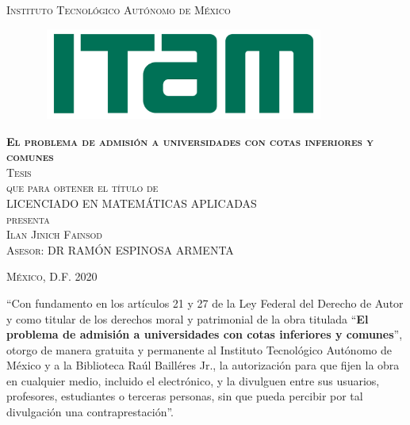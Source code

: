 \documentclass[11pt, oneside]{book}
\begin{document}
\begin{titlepage}
\begin{center}

\textsc{\Large Instituto Tecnológico Autónomo de México}\\[4em]

\begin{figure}[h]
\begin{center}
\includegraphics[width=9.7cm, height=3cm]{logo-ITAM}
\end{center}
\end{figure}

\vspace{4em}

\textsc{\huge \textbf{El problema de admisión a universidades con cotas inferiores y comunes}}\\[4em]

\textsc{\large Tesis}\\[1em]

\textsc{que para obtener el título de}\\[1em]

\textsc{LICENCIADO EN MATEMÁTICAS APLICADAS}\\[1em]

\textsc{presenta}\\[1em]

\textsc{\Large Ilan Jinich Fainsod}\\[1em]

\textsc{\large Asesor: DR RAMÓN ESPINOSA ARMENTA }

\end{center}

\vspace*{\fill}
\textsc{México, D.F. \hspace*{\fill} 2020}

\end{titlepage}



\thispagestyle{empty}
\vspace*{\fill}
\begingroup
``Con fundamento en los artículos 21 y 27 de la Ley Federal del Derecho de Autor y como titular de los derechos moral y patrimonial de la obra titulada ``\textbf{El problema de admisión a universidades con cotas inferiores y comunes}'', otorgo de manera gratuita y permanente al Instituto Tecnológico Autónomo de México y a la Biblioteca Raúl Bailléres Jr., la autorización para que fijen la obra en cualquier medio, incluido el electrónico, y la divulguen entre sus usuarios, profesores, estudiantes o terceras personas, sin que pueda percibir por tal divulgación una contraprestación''.
\end{document}
